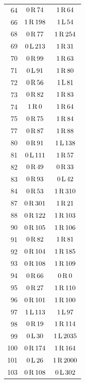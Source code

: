 \begin{longtable}{@{}rcc@{}}
64 & $0\,\mathrm{R}\,74$ & $1\,\mathrm{R}\,64$\\
66 & $1\,\mathrm{R}\,198$ & $1\,\mathrm{L}\,54$\\
68 & $0\,\mathrm{R}\,77$ & $1\,\mathrm{R}\,254$\\
69 & $0\,\mathrm{L}\,213$ & $1\,\mathrm{R}\,31$\\
70 & $0\,\mathrm{R}\,99$ & $1\,\mathrm{R}\,63$\\
71 & $0\,\mathrm{L}\,91$ & $1\,\mathrm{R}\,80$\\
72 & $0\,\mathrm{R}\,56$ & $1\,\mathrm{L}\,81$\\
73 & $0\,\mathrm{R}\,82$ & $1\,\mathrm{R}\,83$\\
74 & $1\,\mathrm{R}\,0$ & $1\,\mathrm{R}\,64$\\
75 & $0\,\mathrm{R}\,75$ & $1\,\mathrm{R}\,84$\\
77 & $0\,\mathrm{R}\,87$ & $1\,\mathrm{R}\,88$\\
80 & $0\,\mathrm{R}\,91$ & $1\,\mathrm{L}\,138$\\
81 & $0\,\mathrm{L}\,111$ & $1\,\mathrm{R}\,57$\\
82 & $0\,\mathrm{R}\,49$ & $0\,\mathrm{R}\,33$\\
83 & $0\,\mathrm{R}\,93$ & $0\,\mathrm{L}\,42$\\
84 & $0\,\mathrm{R}\,53$ & $1\,\mathrm{R}\,310$\\
87 & $0\,\mathrm{R}\,301$ & $1\,\mathrm{R}\,21$\\
88 & $0\,\mathrm{R}\,122$ & $1\,\mathrm{R}\,103$\\
90 & $0\,\mathrm{R}\,105$ & $1\,\mathrm{R}\,106$\\
91 & $0\,\mathrm{R}\,82$ & $1\,\mathrm{R}\,81$\\
92 & $0\,\mathrm{R}\,104$ & $1\,\mathrm{R}\,185$\\
93 & $0\,\mathrm{R}\,108$ & $1\,\mathrm{R}\,109$\\
94 & $0\,\mathrm{R}\,66$ & $0\,\mathrm{R}\,0$\\
95 & $0\,\mathrm{R}\,27$ & $1\,\mathrm{R}\,110$\\
96 & $0\,\mathrm{R}\,101$ & $1\,\mathrm{R}\,100$\\
97 & $1\,\mathrm{L}\,113$ & $1\,\mathrm{L}\,97$\\
98 & $0\,\mathrm{R}\,19$ & $1\,\mathrm{R}\,114$\\
99 & $0\,\mathrm{L}\,30$ & $1\,\mathrm{L}\,2035$\\
100 & $0\,\mathrm{R}\,174$ & $1\,\mathrm{R}\,164$\\
101 & $0\,\mathrm{L}\,26$ & $1\,\mathrm{R}\,2000$\\
103 & $0\,\mathrm{R}\,108$ & $0\,\mathrm{L}\,302$\\

\end{longtable}
